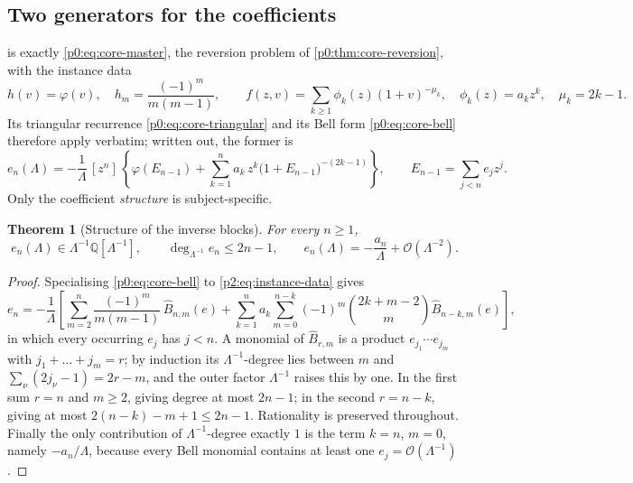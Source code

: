 \documentclass[11pt,a4paper,oneside]{book}
\theoremstyle{plain}
\newtheorem{theorem}{Theorem}[chapter]
\theoremstyle{definition}
\theoremstyle{remark}
\newcommand{\Rat}{\mathbb{Q}}
\newcommand{\Coef}[1]{[#1]\,}
\newcommand{\bigO}{\mathcal{O}}
\newcommand{\OB}{\widehat{B}}
\begin{document}
\subsection{Two generators for the coefficients}

 is exactly \cref{p0:eq:core-master}, the reversion
problem of \cref{p0:thm:core-reversion}, with the instance data
\begin{equation}
 h(v)=\varphi(v),\quad h_m=\frac{(-1)^m}{m(m-1)},
 \qquad
 f(z,v)=\sum_{k\ge1}\phi_k(z)(1+v)^{-\mu_k},
 \quad \phi_k(z)=a_kz^k,\quad \mu_k=2k-1 .
 \label{p2:eq:instance-data}
\end{equation}
Its triangular recurrence \cref{p0:eq:core-triangular} and its Bell form
\cref{p0:eq:core-bell} therefore apply verbatim; written out, the former is
\begin{equation}
 e_n(\Lambda)=-\frac1\Lambda\,\Coef{z^n}
 \left\{\varphi(E_{n-1})
 +\sum_{k=1}^{n}a_k\,z^k\bigl(1+E_{n-1}\bigr)^{-(2k-1)}\right\},
 \qquad E_{n-1}=\sum_{j<n}e_jz^j .
 \label{p2:eq:recurrence}
\end{equation}
Only the coefficient \emph{structure} is subject-specific.

\begin{theorem}[Structure of the inverse blocks]
\label{p2:thm:recurrence}
For every \(n\ge1\),
\begin{equation}
 e_n(\Lambda)\in\Lambda^{-1}\Rat[\Lambda^{-1}],
 \qquad
 \deg_{\Lambda^{-1}}e_n\le 2n-1,
 \qquad
 e_n(\Lambda)=-\frac{a_n}\Lambda+\bigO(\Lambda^{-2}).
 \label{p2:eq:en-structure}
\end{equation}
\end{theorem}

\begin{proof}
Specialising \cref{p0:eq:core-bell} to \cref{p2:eq:instance-data} gives
\begin{equation}
 e_n=-\frac1\Lambda\left[
  \sum_{m=2}^{n}\frac{(-1)^m}{m(m-1)}\,\OB_{n,m}(e)
  +\sum_{k=1}^{n}a_k\sum_{m=0}^{n-k}(-1)^m\binom{2k+m-2}{m}
     \OB_{n-k,m}(e)\right],
 \label{p2:eq:bell-recurrence}
\end{equation}
in which every occurring \(e_j\) has \(j<n\).  A monomial of \(\OB_{r,m}\) is a
product
\(e_{j_1}\cdots e_{j_m}\) with \(j_1+\dots+j_m=r\); by induction its
\(\Lambda^{-1}\)-degree lies between \(m\) and
\(\sum_\nu(2j_\nu-1)=2r-m\), and the outer factor \(\Lambda^{-1}\) raises this
by one.  In the first sum \(r=n\) and \(m\ge2\), giving degree at most
\(2n-1\); in the second \(r=n-k\), giving at most \(2(n-k)-m+1\le2n-1\).
Rationality is preserved throughout.  Finally the only contribution of
\(\Lambda^{-1}\)-degree exactly \(1\) is the term \(k=n\), \(m=0\), namely
\(-a_n/\Lambda\), because every Bell monomial contains at least one
\(e_j=\bigO(\Lambda^{-1})\).
\end{proof}
\end{document}
